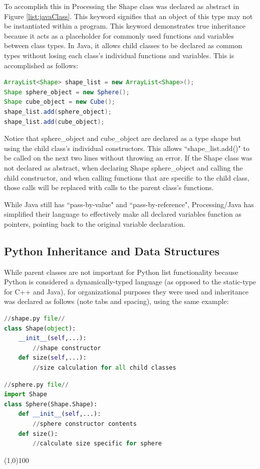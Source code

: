 To accomplish this in Processing the Shape class was declared as abstract in Figure \ref{list:javaClass}.  This keyword signifies that an object of this type may not be instantiated within a program.  This keyword demonstrates true inheritance because it acts as a placeholder for commonly used functions and variables between class types.  In Java, it allows child classes to be declared as common types without losing each class's individual functions and variables. This is accomplished as follows:
\begin{lstlisting}[language=Java, caption=Java ArrayList Example, style=mystyle]
ArrayList<Shape> shape_list = new ArrayList<Shape>();
Shape sphere_object = new Sphere();
Shape cube_object = new Cube();
shape_list.add(sphere_object);
shape_list.add(cube_object);
\end{lstlisting}
\doublespacing
Notice that sphere\_object and cube\_object are declared as a type shape but using the child class's individual constructors.  This allows ``shape\_list.add()" to be called on the next two lines without throwing an error.  If the Shape class was not declared as abstract, when declaring Shape sphere\_object and calling the child constructor, and when calling functions that are specific to the child class, those calls will be replaced with calls to the parent class's functions.  

While Java still has ``pass-by-value" and ``pass-by-reference", Processing/Java has simplified their language to effectively make all declared variables function as pointers, pointing back to the original variable declaration.

\subsection{Python Inheritance and Data Structures}
While parent classes are not important for Python list functionality because Python is considered a dynamically-typed language (as opposed to the static-type for C++ and Java), for organizational purposes they were used and inheritance was declared as follows (note tabs and spacing), using the same example:

\singlespacing
\begin{lstlisting}[language=Python, style=mystyle]
//shape.py file//
class Shape(object):
    __init__(self,...):
        //shape constructor
    def size(self,...):
        //size calculation for all child classes
\end{lstlisting}
\begin{lstlisting}[language=Python, caption=Python Class Inheritance Example, style=mystyle]
//sphere.py file//
import Shape
class Sphere(Shape.Shape):
    def __init__(self,...):
        //sphere constructor contents
    def size():
        //calculate size specific for sphere
\end{lstlisting}
\begin{center}
\line(1,0){100}
\end{center}
\doublespacing
